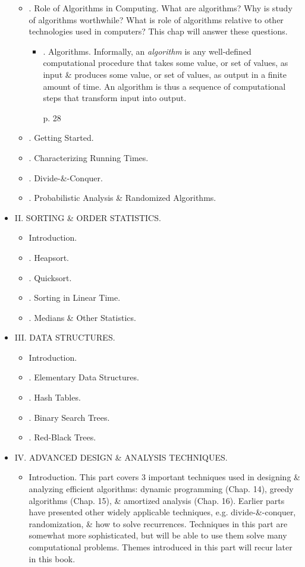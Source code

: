 \documentclass{article}
\begin{document}
\begin{itemize}
\begin{itemize}
\begin{enumerate}
		\end{enumerate}		
		\item {. Role of Algorithms in Computing.} What are algorithms? Why is study of algorithms worthwhile? What is role of algorithms relative to other technologies used in computers? This chap will answer these questions.
		\begin{itemize}
			\item {. Algorithms.} Informally, an {\it algorithm} is any well-defined computational procedure that takes some value, or set of values, as input \& produces some value, or set of values, as output in a finite amount of time. An algorithm is thus a sequence of computational steps that transform input into output.
			
			p. 28
		\end{itemize}
		\item {. Getting Started.}
		\item {. Characterizing Running Times.}
		\item {. Divide-\&-Conquer.}
		\item {. Probabilistic Analysis \& Randomized Algorithms.}
	\end{itemize}
	\item {\sf II. SORTING \& ORDER STATISTICS.}
	\begin{itemize}
		\item {\sf Introduction.}
		\item {. Heapsort.}
		\item {. Quicksort.}
		\item {. Sorting in Linear Time.}
		\item {. Medians \& Other Statistics.}
	\end{itemize}
	\item {\sf III. DATA STRUCTURES.}
	\begin{itemize}
		\item {\sf Introduction.}
		\item {. Elementary Data Structures.}
		\item {. Hash Tables.}
		\item {. Binary Search Trees.}
		\item {. Red-Black Trees.}
	\end{itemize}
	\item {\sf IV. ADVANCED DESIGN \& ANALYSIS TECHNIQUES.}
	\begin{itemize}
		\item {\sf Introduction.} This part covers 3 important techniques used in designing \& analyzing efficient algorithms: dynamic programming (Chap. 14), greedy algorithms (Chap. 15), \& amortized analysis (Chap. 16). Earlier parts have presented other widely applicable techniques, e.g. divide-\&-conquer, randomization, \& how to solve recurrences. Techniques in this part are somewhat more sophisticated, but will be able to use them solve many computational problems. Themes introduced in this part will recur later in this book.
		

\end{itemize}
\end{itemize}
\end{document}
